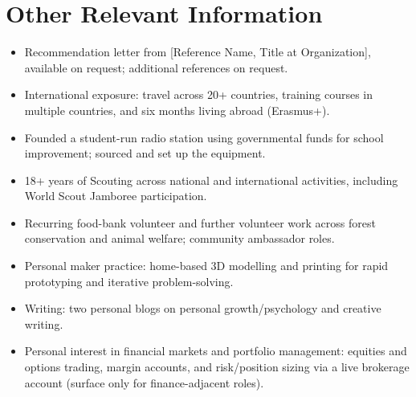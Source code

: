 \documentclass[10pt,a4paper]{article}
\begin{document}
\section{Other Relevant Information}

\begin{itemize}
\item Recommendation letter from [Reference Name, Title at Organization], available on request; additional references on request.
\item International exposure: travel across 20+ countries, training courses in multiple countries, and six months living abroad (Erasmus+).
\item Founded a student-run radio station using governmental funds for school improvement; sourced and set up the equipment.
\item 18+ years of Scouting across national and international activities, including World Scout Jamboree participation.
\item Recurring food-bank volunteer and further volunteer work across forest conservation and animal welfare; community ambassador roles.
\item Personal maker practice: home-based 3D modelling and printing for rapid prototyping and iterative problem-solving.
\item Writing: two personal blogs on personal growth/psychology and creative writing.
\item Personal interest in financial markets and portfolio management: equities and options trading, margin accounts, and risk/position sizing via a live brokerage account (surface only for finance-adjacent roles).
\end{itemize}
\end{document}

